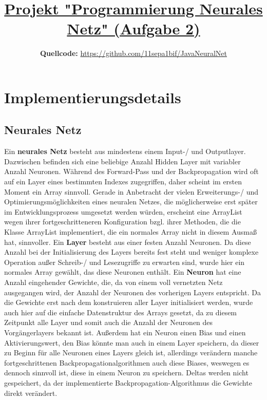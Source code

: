 \documentclass[10pt]{article}
\begin{document}
\title{\textbf{\underline{Projekt "Programmierung Neurales Netz" (Aufgabe 2)}}}
\author{\normalsize \textbf{Quellcode:} \url{https://github.com/11sepa1bif/JavaNeuralNet}}
\date{}
\maketitle

\section*{Implementierungsdetails}
\subsection*{Neurales Netz}
Ein \textbf{neurales Netz} besteht aus mindestens einem Input-/ und Outputlayer. Dazwischen befinden sich eine beliebige Anzahl Hidden Layer mit variabler Anzahl Neuronen. Während des Forward-Pass und der Backpropagation wird oft auf ein Layer eines bestimmten Indexes zugegriffen, daher scheint im ersten Moment ein Array sinnvoll. Gerade in Anbetracht der vielen Erweiterungs-/ und Optimierungsmöglichkeiten eines neuralen Netzes, die möglicherweise erst später im Entwicklungsprozess umgesetzt werden würden, erscheint eine ArrayList wegen ihrer fortgeschritteneren Konfiguration bzgl. ihrer Methoden, die die Klasse ArrayList implementiert, die ein normales Array nicht in diesem Ausmaß hat, sinnvoller. \newline
Ein \textbf{Layer} besteht aus einer festen Anzahl Neuronen. Da diese Anzahl bei der Initialisierung des Layers bereits fest steht und weniger komplexe Operation außer Schreib-/ und Lesezugriffe zu erwarten sind, wurde hier ein normales Array gewählt, das diese Neuronen enthält.\newline
Ein \textbf{Neuron} hat eine Anzahl eingehender Gewichte, die, da von einem voll vernetzten Netz ausgegangen wird, der Anzahl der Neuronen des vorherigen Layers entspricht. Da die Gewichte erst nach dem konstruieren aller Layer initialisiert werden, wurde auch hier auf die einfache Datenstruktur des Arrays gesetzt, da zu diesem Zeitpunkt alle Layer und somit auch die Anzahl der Neuronen des Vorgängerlayers bekannt ist. Außerdem hat ein Neuron einen Bias und einen Aktivierungswert, den Bias könnte man auch in einem Layer speichern, da dieser zu Beginn für alle Neuronen eines Layers gleich ist, allerdings verändern manche fortgeschrittenen Backpropagationalgorithmen auch diese Biases, weswegen es dennoch sinnvoll ist, diese in einem Neuron zu speichern. Deltas werden nicht gespeichert, da der implementierte Backpropagation-Algorithmus die Gewichte direkt verändert.
\end{document}
